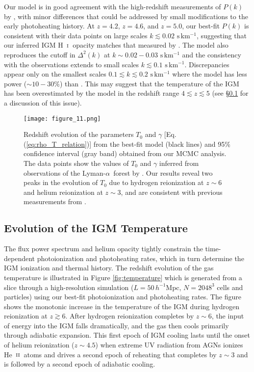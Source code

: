 \documentclass[twocolumn]{aastex62}
\newcommand\Lya{Lyman-$\alpha$}
\def\HI{\hbox{\rm H~$\scriptstyle\rm I$}}
\def\HeII{\hbox{He~$\scriptstyle\rm II$}}
\begin{document}
Our model is in good agreement with the high-redshift measurements of $P(k)$ 
by \cite{boera2019a}, with minor differences that could be addressed by small modifications to the early photoheating history. At $z=4.2$, $z=4.6$, and  $z=5.0$, 
our best-fit $P(k)$ is consistent with their data points on large scales $k\lesssim 0.02 \,\, \mathrm{s \, km^{-1}}$, suggesting that our inferred IGM \HI\ opacity matches that measured by \cite{boera2019a}.
The model also reproduces the cutoff in $\Delta^2(k)$ at $k\sim 0.02-0.03\,\, \mathrm{s \, km^{-1}}$ and the consistency with the observations extends to small scales $ k \lesssim 0.1 \,\, \mathrm{s \, km^{-1}}$.
Discrepancies appear only on the smallest scales $ 0.1 \lesssim k \lesssim 0.2 \,\, \mathrm{s \, km^{-1}}$ where the model has 
less power ($\sim 10-30\%$) than \cite{boera2019a}.
This may suggest that the temperature of the IGM has been overestimated by the 
model in the redshift range $4 \lesssim z \lesssim 5$ (see \S \ref{sec:evolution_temperature } for a discussion of this issue). 



\begin{figure*}
\texttt{[image: figure\_11.png]}
\caption{Redshift evolution of the parameters $T_0$ and $\gamma$ [Eq. (\ref{eq:rho_T_relation})] from the best-fit model (black lines) and 95\% confidence interval (gray band) obtained from our MCMC analysis.
The data points show the values of  $T_0$ and $\gamma$ inferred 
from observations of the \Lya\ forest by 
\citet{bolton2014a,hiss2018a,boera2019a,walther2019a, gaikwad2020a,gaikwad2020b}.
Our results reveal two peaks in the evolution of $T_0$ due to hydrogen reionization at $z\sim 6$ and helium reionization at $z\sim 3$, and are consistent with previous measurements from 
\cite{gaikwad2020a, gaikwad2020b}.}
\label{fig:T0_gamma}
\end{figure*}


\subsection{Evolution of the IGM Temperature}
\label{sec:evolution_temperature }

The flux power spectrum and helium opacity tightly constrain the time-dependent photoionization and photoheating rates,
which in turn determine the IGM ionization and thermal history.
The redshift evolution of the gas temperature is illustrated in Figure \ref{fig:temperature}
which is generated from a slice through a high-resolution simulation ($L=50\,h^{-1}$Mpc, $N=2048^3$ cells and particles)
using  our best-fit photoionization and photoheating rates.
The figure shows the monotonic increase in the temperature of the IGM during hydrogen reionization at $z \gtrsim 6$. After hydrogen reionization
completes by $z\sim 6$, the input of energy into the IGM falls dramatically, and the gas then cools primarily through adiabatic expansion.
This first epoch of IGM cooling lasts 
until the onset of helium reionization ($z\sim 4.5$) when extreme UV radiation from AGNs ionizes \HeII\ atoms and drives a second epoch of reheating that completes by $z\sim 3$ and is followed by a second epoch of adiabatic cooling.
\end{document}
